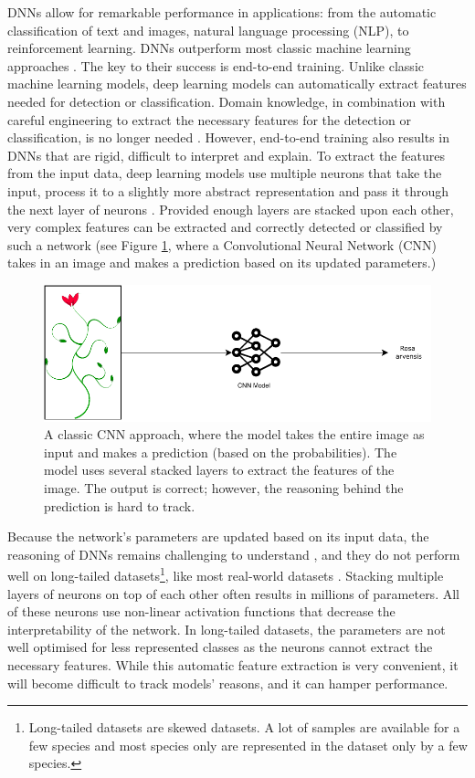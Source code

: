 \documentclass[a4paper, 12pt, oneside]{book} %
\begin{document}
DNNs allow for remarkable performance in applications: from the automatic classification of text and images, natural language processing (NLP), to reinforcement learning.
DNNs outperform most classic machine learning approaches \autocite{he_delving_2015, brown_language_2020}.
The key to their success is end-to-end training.
Unlike classic machine learning models, deep learning models can automatically extract features needed for detection or classification.
Domain knowledge, in combination with careful engineering to extract the necessary features for the detection or classification, is no longer needed \autocite{lecun_deep_2015}.
However, end-to-end training also results in DNNs that are rigid, difficult to interpret and explain.
To extract the features from the input data, deep learning models use multiple neurons that take the input, process it to a slightly more abstract representation and pass it through the next layer of neurons \autocite{schmidhuber_deep_2015}.
Provided enough layers are stacked upon each other, very complex features can be extracted and correctly detected or classified by such a network (see Figure \ref{fig:CNN}, where a Convolutional Neural Network (CNN) takes in an image and makes a prediction based on its updated parameters.)
\begin{figure} [tbp]
    \centering
    \vspace{0cm}
    \includegraphics[width=\textwidth]{figures/CNN.pdf}
    \caption[Classic CNN]{A classic CNN approach, where the model takes the entire image as input and makes a prediction (based on the probabilities). The model uses several stacked layers to extract the features of the image. The output is correct; however, the reasoning behind the prediction is hard to track.}
    \label{fig:CNN}
\end{figure}

Because the network's parameters are updated based on its input data, the reasoning of DNNs remains challenging to understand \autocite{li_interpretable_2021, losch_interpretability_2019}, and they do not perform well on long-tailed datasets\footnote{Long-tailed datasets are skewed datasets. A lot of samples are available for a few species and most species only are represented in the dataset only by a few species.}, like most real-world datasets \autocite{van_horn_inaturalist_2018}.
Stacking multiple layers of neurons on top of each other often results in millions of parameters.
All of these neurons use non-linear activation functions that decrease the interpretability of the network.
In long-tailed datasets, the parameters are not well optimised for less represented classes as the neurons cannot extract the necessary features.
While this automatic feature extraction is very convenient, it will become difficult to track models' reasons, and it can hamper performance.
\end{document}
